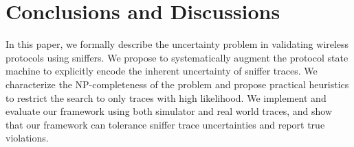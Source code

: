 \section{Conclusions and Discussions}
\label{sec:conclusion}

In this paper, we formally describe the uncertainty problem in validating
wireless protocols using sniffers. We propose to systematically augment the
protocol state machine to explicitly encode the inherent uncertainty of sniffer
traces. We characterize the NP-completeness of the problem and propose practical
heuristics to restrict the search to only traces with high likelihood.  We
implement and evaluate our framework using both \ns{} simulator and real world
traces, and show that our framework can tolerance sniffer trace uncertainties
and report true violations.

\begin{comment}
Finally, we discuss a few challenges and future
directions.

\textbf{Verification Coverage.} Given a single sniffer trace, it is possible
that not all the states in the state machine are visited during the verification
process. For instance, a rate control state machine based on certain consecutive
packet losses patterns can not be verified if no such consecutive losses appear
in the sniffer trace. In general, given a protocol state machine, how to extract
the packet patterns for each state to be reached and how to alter the testing
such that such patterns can be observed?

\textbf{State Machine Generation.} We manually translated the protocols studied
in this paper into monitor state machines based on the source code, comments and
documentation. The process is time-consuming and error-prone. A more scalable
approach would be taking the protocol specification written in certain formal
language, and automatically translate such specification into state machines
that can be used for verification process.

\end{comment}
